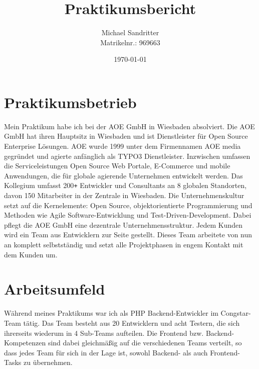 \documentclass[11pt,a4paper]{article}
\title{Praktikumsbericht}
\author{Michael Sandritter \\ Matrikelnr.: 969663}
\date{\today}
\begin{document}
\maketitle %

\begin{figure} 
\end{figure}

\newpage %

\section{Praktikumsbetrieb} \label{sec:betrieb} 

Mein Praktikum habe ich bei der AOE GmbH in Wiesbaden absolviert.
Die AOE GmbH hat ihren Hauptsitz in Wiesbaden und ist Dienstleister für Open Source Enterprise Lösungen.
AOE wurde 1999 unter dem Firmennamen AOE media gegründet und agierte anfänglich als TYPO3 Dienstleister.
Inzwischen umfassen die Serviceleistungen Open Source Web Portale, E-Commerce und mobile Anwendungen,
die für globale agierende Unternehmen entwickelt werden.
Das Kollegium umfasst 200\texttt{+} Entwickler und Consultants an 8 globalen Standorten, davon 150 Mitarbeiter in der Zentrale in Wiesbaden.
Die Unternehmenskultur setzt auf die Kernelemente: Open Source, objektorientierte Programmierung und Methoden
wie Agile Software-Entwicklung und Test-Driven-Development. 
Dabei pflegt die AOE GmbH eine dezentrale Unternehmensstruktur. Jedem Kunden wird ein Team aus Entwicklern zur Seite gestellt.
Dieses Team arbeitete von nun an komplett selbstständig und setzt alle Projektphasen in engem Kontakt mit dem Kunden um.


\section{Arbeitsumfeld} \label{sec:umfeld}

Während meines Praktikums war ich als PHP Backend-Entwickler im Congstar-Team tätig.
Das Team besteht aus 20 Entwicklern und acht Testern, die sich ihrerseits wiederum in 4 Sub-Teams aufteilen.
Die Frontend bzw. Backend-Kompetenzen sind dabei gleichmäßig auf die verschiedenen Teams verteilt, so dass jedes Team für sich in der Lage ist, sowohl Backend- als auch Frontend-Tasks zu übernehmen.
\end{document}
